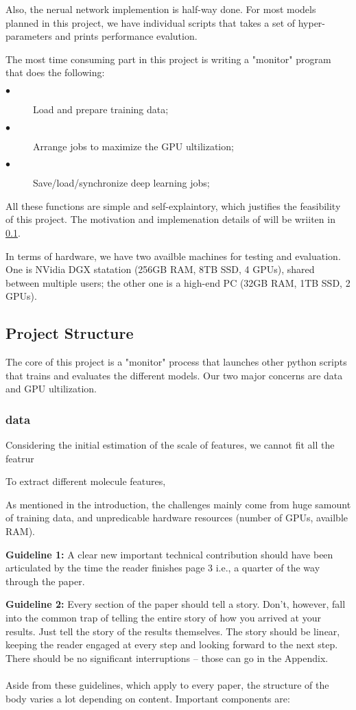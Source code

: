 \documentclass[10pt,twocolumn]{article}
\begin{document}
Also, the nerual network implemention is half-way done. 
For most models planned in this project, we have individual scripts that takes a set of hyper-parameters and prints performance evalution. 

The most time consuming part in this project is writing a "monitor" program that does the following:
\begin{description}
	\item[$\bullet$]  Load and prepare training data;
	\item[$\bullet$]  Arrange jobs to maximize the GPU ultilization;
	\item[$\bullet$]  Save/load/synchronize deep learning jobs; 
\end{description}
All these functions are simple and self-explaintory, which justifies the feasibility of this project. 
The motivation and implemenation details of will be wriiten in \ref{projstruct}.

In terms of hardware, we have two availble machines for testing and evaluation. 
One is NVidia DGX statation (256GB RAM, 8TB SSD, 4 GPUs), shared between multiple users; the other one is a high-end PC (32GB RAM, 1TB SSD, 2 GPUs). 

\subsection{Project Structure} \label{projstruct}

The core of this project is a "monitor" process that launches other python scripts that trains and evaluates the different models. 
Our two major concerns are data and GPU ultilization.

\subsubsection*{data}
Considering the initial estimation of the scale of features, we cannot fit all the featrur

To extract different molecule features, 

As mentioned in the introduction, the challenges mainly come from huge samount of training data, and unpredicable hardware resources (number of GPUs, availble RAM). 

\textbf{Guideline 1:} A clear new important technical contribution should have been articulated by the time the reader finishes page 3 i.e., a quarter of the way through the paper.

\textbf{Guideline 2:} Every section of the paper should tell a story. Don't, however, fall into the common trap of telling the entire story of how you arrived at your results. Just tell the story of the results themselves. The story should be linear, keeping the reader engaged at every step and looking forward to the next step. There should be no significant interruptions -- those can go in the Appendix.
\\
\\
Aside from these guidelines, which apply to every paper, the structure of the body varies a lot depending on content. Important components are:
\end{document}
